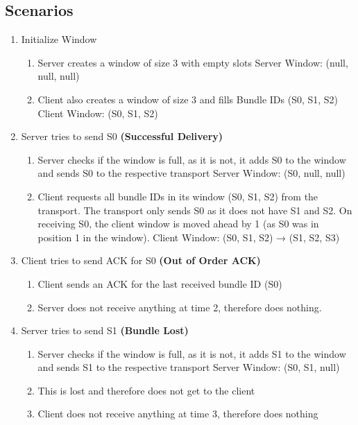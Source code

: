 \subsection{Scenarios}

\begin{enumerate} [start=0]
    \item Initialize Window
    \begin{enumerate}
        \item Server creates a window of size 3 with empty slots
            \subsubitem Server Window: (null, null, null)
        \item Client also creates a window of size 3 and fills Bundle IDs (S0, S1, S2)
            \subsubitem Client Window: (S0, S1, S2)
    \end{enumerate}
    
    \item Server tries to send S0 \textbf{(Successful Delivery)}
    \begin{enumerate}
        \item Server checks if the window is full, as it is not, it adds S0 to the window and sends S0 to the respective transport
            \subsubitem Server Window: (S0, null, null)
        \item Client requests all bundle IDs in its window (S0, S1, S2) from the transport. The transport only sends S0 as it does not have S1 and S2. On receiving S0, the client window is moved ahead by 1 (as S0 was in position 1 in the window).
            \subsubitem Client Window: (S0, S1, S2) → (S1, S2, S3)
    \end{enumerate}
    
    \item Client tries to send ACK for S0 \textbf{(Out of Order ACK)}
    \begin{enumerate}
        \item Client sends an ACK for the last received bundle ID (S0)
        \item Server does not receive anything at time 2, therefore does nothing.
    \end{enumerate}
    
    \item Server tries to send S1 \textbf{(Bundle Lost)}
    \begin{enumerate}
        \item Server checks if the window is full, as it is not, it adds S1 to the window and sends S1 to the respective transport
            \subitem Server Window: (S0, S1, null)
        \item This is lost and therefore does not get to the client
        \item Client does not receive anything at time 3, therefore does nothing
    \end{enumerate}


\end{enumerate}
